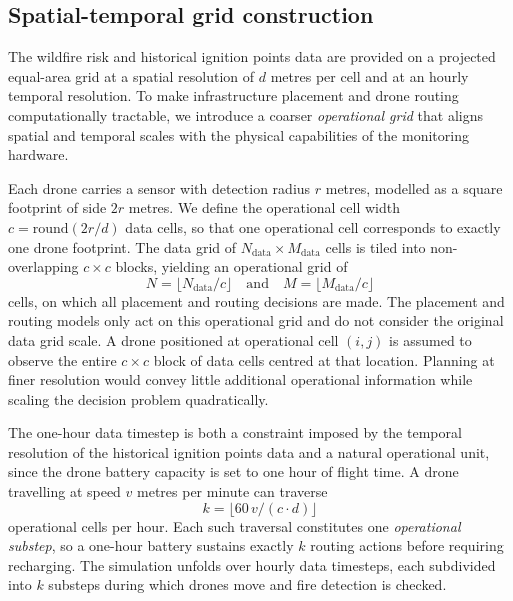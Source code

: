 \documentclass[pdflatex,sn-mathphys-num]{sn-jnl}%
\theoremstyle{thmstyleone}%
\theoremstyle{thmstyletwo}%
\theoremstyle{thmstylethree}%
\begin{document}

\subsection*{Spatial-temporal grid construction}

The wildfire risk and historical ignition points data are provided on a projected equal-area grid at a spatial resolution of $d$ metres per cell and at an hourly temporal resolution. To make infrastructure placement and drone routing computationally tractable, we introduce a coarser \textit{operational grid} that aligns spatial and temporal scales with the physical capabilities of the monitoring hardware.

Each drone carries a sensor with detection radius $r$ metres, modelled as a square footprint of side $2r$ metres. We define the operational cell width $c = \mathrm{round}(2r/d)$ data cells, so that one operational cell corresponds to exactly one drone footprint. The data grid of $N_\mathrm{data} \times M_\mathrm{data}$ cells is tiled into non-overlapping $c \times c$ blocks, yielding an operational grid of
\[
N = \bigl\lfloor N_\mathrm{data}/c \bigr\rfloor \quad \text{and} \quad M = \bigl\lfloor M_\mathrm{data}/c \bigr\rfloor
\]
cells, on which all placement and routing decisions are made. The placement and routing models only act on this operational grid and do not consider the original data grid scale. A drone positioned at operational cell $(i,j)$ is assumed to observe the entire $c \times c$ block of data cells centred at that location. Planning at finer resolution would convey little additional operational information while scaling the decision problem quadratically.

The one-hour data timestep is both a constraint imposed by the temporal resolution of the historical ignition points data and a natural operational unit, since the drone battery capacity is set to one hour of flight time. A drone travelling at speed $v$ metres per minute can traverse
\[
k = \bigl\lfloor 60\,v / (c \cdot d) \bigr\rfloor
\]
operational cells per hour. Each such traversal constitutes one \textit{operational substep}, so a one-hour battery sustains exactly $k$ routing actions before requiring recharging. The simulation unfolds over hourly data timesteps, each subdivided into $k$ substeps during which drones move and fire detection is checked.
\end{document}
